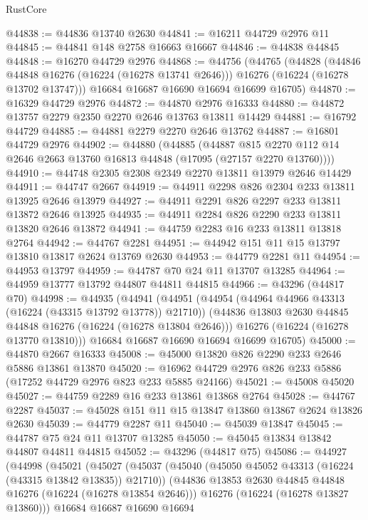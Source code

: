 \begin{lexlean}{RustCore}
\begin{coremodule}
@44838 := @44836 @13740 @2630
@44841 := @16211 @44729 @2976 @11
@44845 := @44841 @148 @2758 @16663 @16667
@44846 := @44838 @44845
@44848 := @16270 @44729 @2976
@44868 := @44756
    (@44765
      (@44828
        (@44846 @44848 @16276 (@16224 (@16278 @13741 @2646)))
        @16276
        (@16224 (@16278 @13702 @13747)))
      @16684
      @16687
      @16690
      @16694
      @16699
      @16705)
@44870 := @16329 @44729 @2976
@44872 := @44870 @2976 @16333
@44880 := @44872 @13757 @2279 @2350 @2270 @2646 @13763 @13811 @14429
@44881 := @16792 @44729
@44885 := @44881 @2279 @2270 @2646 @13762
@44887 := @16801 @44729 @2976
@44902 := @44880
    (@44885
      (@44887 @815 @2270 @112 @14 @2646 @2663 @13760 @16813 @44848 (@17095 (@27157 @2270 @13760))))
@44910 := @44748 @2305 @2308 @2349 @2270 @13811 @13979 @2646 @14429
@44911 := @44747 @2667
@44919 := @44911 @2298 @826 @2304 @233 @13811 @13925 @2646 @13979
@44927 := @44911 @2291 @826 @2297 @233 @13811 @13872 @2646 @13925
@44935 := @44911 @2284 @826 @2290 @233 @13811 @13820 @2646 @13872
@44941 := @44759 @2283 @16 @233 @13811 @13818 @2764
@44942 := @44767 @2281
@44951 := @44942 @151 @11 @15 @13797 @13810 @13817 @2624 @13769 @2630
@44953 := @44779 @2281 @11
@44954 := @44953 @13797
@44959 := @44787 @70 @24 @11 @13707 @13285
@44964 := @44959 @13777 @13792 @44807 @44811 @44815
@44966 := @43296 (@44817 @70)
@44998 := @44935
    (@44941
      (@44951
        (@44954 (@44964 @44966 @43313 (@16224 (@43315 @13792 @13778)) @21710))
        (@44836 @13803 @2630 @44845 @44848 @16276 (@16224 (@16278 @13804 @2646)))
        @16276
        (@16224 (@16278 @13770 @13810)))
      @16684
      @16687
      @16690
      @16694
      @16699
      @16705)
@45000 := @44870 @2667 @16333
@45008 := @45000 @13820 @826 @2290 @233 @2646 @5886 @13861 @13870
@45020 := @16962 @44729 @2976 @826 @233 @5886 (@17252 @44729 @2976 @823 @233 @5885 @24166)
@45021 := @45008 @45020
@45027 := @44759 @2289 @16 @233 @13861 @13868 @2764
@45028 := @44767 @2287
@45037 := @45028 @151 @11 @15 @13847 @13860 @13867 @2624 @13826 @2630
@45039 := @44779 @2287 @11
@45040 := @45039 @13847
@45045 := @44787 @75 @24 @11 @13707 @13285
@45050 := @45045 @13834 @13842 @44807 @44811 @44815
@45052 := @43296 (@44817 @75)
@45086 := @44927
    (@44998
      (@45021
        (@45027
          (@45037
            (@45040 (@45050 @45052 @43313 (@16224 (@43315 @13842 @13835)) @21710))
            (@44836 @13853 @2630 @44845 @44848 @16276 (@16224 (@16278 @13854 @2646)))
            @16276
            (@16224 (@16278 @13827 @13860)))
          @16684
          @16687
          @16690
          @16694

\end{coremodule}
\end{lexlean}
